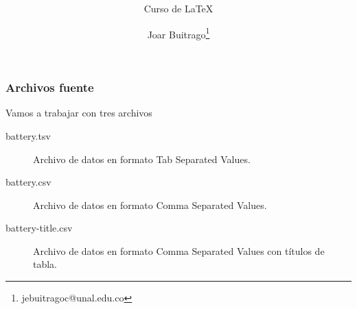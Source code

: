 \documentclass[12pt,aspectratio=169,ignorenonframetext]{ltxbeamer}
\title{{\lmr\textmd{\PGFPlots}}}
\subtitle{Curso de {\lmr\LaTeX}}
\author{Joar Buitrago\texorpdfstring{\thanks{jebuitragoc@unal.edu.co}}{ <jebuitragoc@unal.edu.co>}}
\date{}
\begin{document}
\begin{frame}
\titlepage
\end{frame}





\begin{frame}
\frametitle{Archivos fuente}

Vamos a trabajar con tres archivos

\begin{description}
    \item[battery.tsv] Archivo de datos en formato Tab Separated Values.
    \item[battery.csv] Archivo de datos en formato Comma Separated Values.
    \item[battery-title.csv] Archivo de datos en formato Comma Separated Values con títulos de tabla.
\end{description}
\end{frame}
\end{document}
